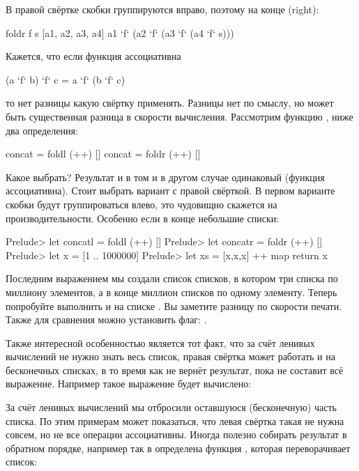 В правой свёртке  скобки группируются вправо, 
поэтому на конце  (right):

\begin{code}
foldr f s [a1, a2, a3, a4]
    a1 `f` (a2 `f` (a3 `f` (a4 `f` s)))
\end{code}

Кажется, что если функция  ассоциативна 

\begin{code}
(a `f` b) `f` c  = a `f` (b `f` c)
\end{code}


\noindent то нет разницы какую свёртку применять. 
Разницы нет по смыслу, но может быть существенная разница 
в скорости вычисления. Рассмотрим функцию , ниже 
два определения:

\begin{code}
concat  = foldl (++) []
concat  = foldr (++) []
\end{code}

Какое выбрать? Результат и в том и в другом случае 
одинаковый (функция \In{++} ассоциативна). Стоит
выбрать вариант с правой свёрткой. В первом варианте
скобки будут группироваться влево, это чудовищно скажется
на производительности. Особенно если в конце небольшие
списки:  

\begin{code}
Prelude> let concatl  = foldl (++) []
Prelude> let concatr  = foldr (++) []
Prelude> let x = [1 .. 1000000]
Prelude> let xs = [x,x,x] ++ map return x
\end{code}

Последним выражением мы создали список списков, 
в котором три списка по миллиону элементов, а в конце
миллион списков по одному элементу. Теперь попробуйте
выполнить  и  на списке .
Вы заметите разницу по скорости печати. Также для 
сравнения можно установить флаг: .

Также интересной особенностью  является
тот факт, что за счёт ленивых вычислений 
не нужно знать весь список, правая свёртка может работать 
и на бесконечных списках, в то время как  
не вернёт результат, пока не составит всё выражение.
Например такое выражение будет вычислено:


За счёт ленивых вычислений мы отбросили оставшуюся
(бесконечную) часть списка. 
По этим примерам может показаться, что левая свёртка такая 
не нужна совсем, но не все операции ассоциативны. Иногда полезно собирать 
результат в обратном порядке, например так в 
определена функция , которая переворачивает
список:

